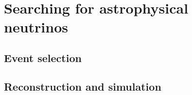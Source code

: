\chapter{Searching for astrophysical neutrinos}

\section{Event selection}

\section{Reconstruction and simulation}

